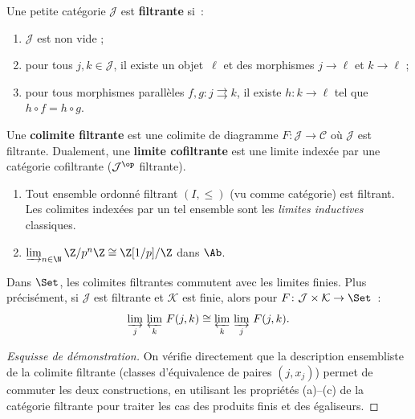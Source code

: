 \begin{definition}\label{def:categorie-filtrante}
Une petite catégorie $\mathcal{J}$ est \textbf{filtrante} si~:
\begin{enumerate}[label=(\alph*)]
\item $\mathcal{J}$ est non vide ;
\item pour tous $j,k\in\mathcal{J}$, il existe un objet~$\ell$ et des
      morphismes $j\to\ell$ et $k\to\ell$ ;
\item pour tous morphismes parallèles $f,g\colon j\rightrightarrows k$,
      il existe $h\colon k\to\ell$ tel que $h\circ f = h\circ g$.
\end{enumerate}
\end{definition}

\begin{definition}\label{def:colimite-filtrante}
Une \textbf{colimite filtrante} est une colimite de diagramme
$F\colon\mathcal{J}\to\mathcal{C}$ où $\mathcal{J}$ est filtrante.
Dualement, une \textbf{limite cofiltrante}
est une limite indexée par une catégorie cofiltrante
($\mathcal{J}^{\op}$ filtrante).
\end{definition}

\begin{exemple}\label{ex:colimites-filtrantes}
\begin{enumerate}[label=(\roman*)]
\item Tout ensemble ordonné filtrant $(I,\leq)$ (vu comme catégorie)
      est filtrant. Les colimites indexées par un tel ensemble sont
      les \emph{limites inductives} classiques.
\item $\varinjlim_{n\in\N}\Z/p^n\Z \cong \Z[1/p]/\Z$ dans $\Ab$.
\end{enumerate}
\end{exemple}

\begin{theoreme}\label{thm:colimites-filtrantes-set}
Dans $\Set$, les colimites filtrantes commutent avec les limites finies.
Plus précisément, si $\mathcal{J}$ est filtrante et $\mathcal{K}$ est finie, alors
pour $F\colon\mathcal{J}\times\mathcal{K}\to\Set$~:
\[
    \varinjlim_j\, \varprojlim_k\, F(j,k)
    \cong \varprojlim_k\, \varinjlim_j\, F(j,k).
\]
\end{theoreme}

\begin{proof}[Esquisse de démonstration]
On vérifie directement que la description ensembliste de la colimite
filtrante (classes d'équivalence de paires $(j,x_j)$) permet de
commuter les deux constructions, en utilisant les propriétés (a)--(c)
de la catégorie filtrante pour traiter les cas des produits finis
et des égaliseurs.
\end{proof}


